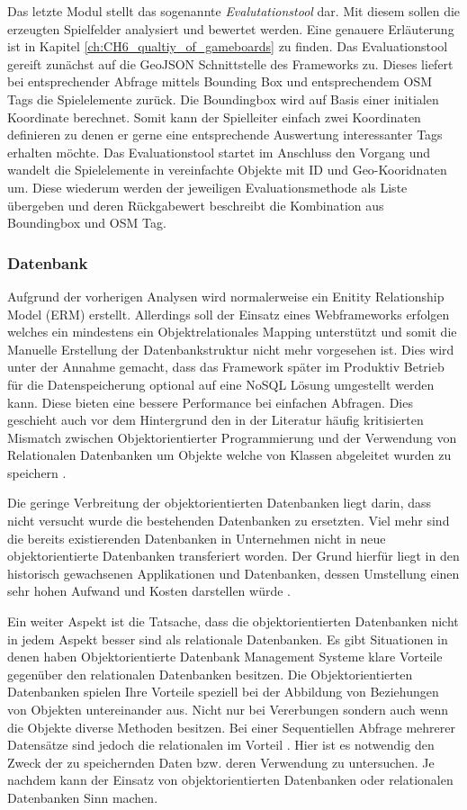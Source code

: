 Das letzte Modul stellt das sogenannte \textit{Evalutationstool} dar.
Mit diesem sollen die erzeugten Spielfelder analysiert und bewertet werden. Eine genauere Erläuterung ist in Kapitel \ref{ch:CH6_qualtiy_of_gameboards} zu finden.
Das Evaluationstool gereift zunächst auf die GeoJSON Schnittstelle des Frameworks zu. Dieses liefert bei entsprechender Abfrage mittels Bounding Box und entsprechendem OSM Tags die Spielelemente zurück. Die Boundingbox wird auf Basis einer initialen Koordinate berechnet. Somit kann der Spielleiter einfach zwei Koordinaten definieren zu denen er gerne eine entsprechende Auswertung interessanter Tags erhalten möchte. Das Evaluationstool startet im Anschluss den Vorgang und wandelt die Spielelemente in vereinfachte Objekte mit ID und Geo-Kooridnaten um. Diese wiederum werden der jeweiligen Evaluationsmethode als Liste übergeben und deren Rückgabewert beschreibt die Kombination aus Boundingbox und OSM Tag.

\subsubsection*{Datenbank}

Aufgrund der vorherigen Analysen wird normalerweise ein Enitity Relationship Model (ERM) erstellt. Allerdings soll der Einsatz eines Webframeworks erfolgen welches ein mindestens ein Objektrelationales Mapping unterstützt und somit die Manuelle Erstellung der Datenbankstruktur nicht mehr vorgesehen ist. Dies wird unter der Annahme gemacht, dass das Framework später im Produktiv Betrieb für die Datenspeicherung optional auf eine NoSQL Lösung umgestellt werden kann. Diese bieten eine bessere Performance bei einfachen Abfragen.
Dies geschieht auch vor dem Hintergrund den in der Literatur häufig kritisierten Mismatch zwischen Objektorientierter Programmierung und der Verwendung von Relationalen Datenbanken um Objekte welche von Klassen abgeleitet wurden zu speichern \cite{Cattell.1991}.

Die geringe Verbreitung der objektorientierten Datenbanken liegt darin, dass nicht
versucht wurde die bestehenden Datenbanken zu ersetzten. Viel mehr sind die bereits existierenden Datenbanken in Unternehmen nicht in neue objektorientierte Datenbanken transferiert worden. Der Grund hierfür liegt in den historisch gewachsenen Applikationen und Datenbanken, dessen Umstellung einen sehr hohen Aufwand und Kosten darstellen würde \cite{Burleson.1994}.

Ein weiter Aspekt ist die Tatsache, dass die objektorientierten Datenbanken nicht in jedem Aspekt
besser sind als relationale Datenbanken. Es gibt Situationen in denen haben Objektorientierte
Datenbank Management Systeme klare Vorteile gegenüber den relationalen Datenbanken besitzen.
Die Objektorientierten Datenbanken spielen Ihre Vorteile speziell bei der Abbildung
von Beziehungen von Objekten untereinander aus. Nicht nur bei Vererbungen sondern auch wenn
die Objekte diverse Methoden besitzen. Bei einer Sequentiellen Abfrage mehrerer Datensätze sind
jedoch die relationalen im Vorteil \cite{Van.2006}. Hier ist es notwendig den Zweck der zu speichernden Daten bzw. deren Verwendung zu untersuchen. Je nachdem kann der Einsatz von objektorientierten Datenbanken oder relationalen Datenbanken Sinn machen.

